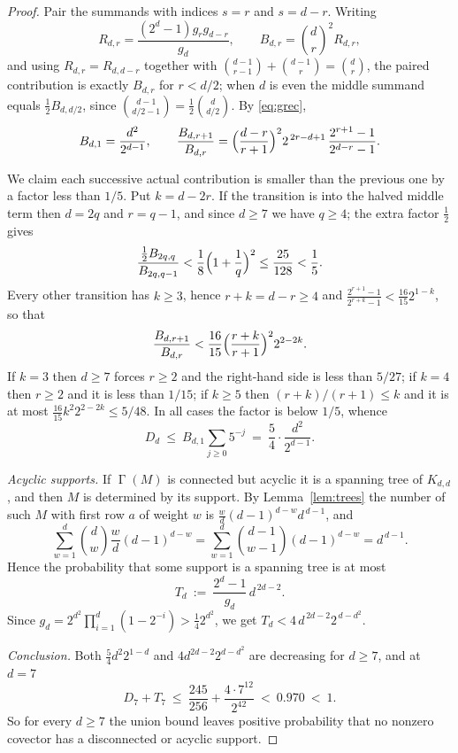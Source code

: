 \documentclass[10pt,a4paper]{amsart}
\DeclareMathOperator{\Gam}{\Gamma}
\begin{document}
\begin{proof}
Pair the summands with indices $s=r$ and $s=d-r$. Writing
\[
R_{d,r}=\frac{(2^{d}-1)g_{r}g_{d-r}}{g_{d}},\qquad B_{d,r}=\binom{d}{r}^{2}R_{d,r},
\]
and using $R_{d,r}=R_{d,d-r}$ together with $\binom{d-1}{r-1}+\binom{d-1}{r}=\binom{d}{r}$, the paired contribution is exactly $B_{d,r}$ for $r<d/2$; when $d$ is even the middle summand equals $\tfrac12 B_{d,d/2}$, since $\binom{d-1}{d/2-1}=\tfrac12\binom{d}{d/2}$. By \eqref{eq:grec},
\[
B_{d,1}=\frac{d^{2}}{2^{d-1}},\qquad
\frac{B_{d,r+1}}{B_{d,r}}=\Bigl(\frac{d-r}{r+1}\Bigr)^{2}2^{\,2r-d+1}\,\frac{2^{r+1}-1}{2^{d-r}-1}.
\]

We claim each successive actual contribution is smaller than the previous one by a factor less than $1/5$. Put $k=d-2r$. If the transition is into the halved middle term then $d=2q$ and $r=q-1$, and since $d\ge 7$ we have $q\ge 4$; the extra factor $\tfrac12$ gives
\[
\frac{\tfrac12 B_{2q,q}}{B_{2q,q-1}}<\frac{1}{8}\Bigl(1+\frac{1}{q}\Bigr)^{2}\le\frac{25}{128}<\frac{1}{5}.
\]
Every other transition has $k\ge 3$, hence $r+k=d-r\ge 4$ and $\frac{2^{r+1}-1}{2^{r+k}-1}<\frac{16}{15}2^{1-k}$, so that
\[
\frac{B_{d,r+1}}{B_{d,r}}<\frac{16}{15}\Bigl(\frac{r+k}{r+1}\Bigr)^{2}2^{2-2k}.
\]
If $k=3$ then $d\ge 7$ forces $r\ge 2$ and the right-hand side is less than $5/27$; if $k=4$ then $r\ge 2$ and it is less than $1/15$; if $k\ge 5$ then $(r+k)/(r+1)\le k$ and it is at most $\tfrac{16}{15}k^{2}2^{2-2k}\le 5/48$. In all cases the factor is below $1/5$, whence
\begin{equation}\label{eq:Ddbound}
D_{d}\ \le\ B_{d,1}\sum_{j\ge 0}5^{-j}\ =\ \frac{5}{4}\cdot\frac{d^{2}}{2^{d-1}}.
\end{equation}

\smallskip
\noindent\emph{Acyclic supports.} If $\Gam(M)$ is connected but acyclic it is a spanning tree of $K_{d,d}$, and then $M$ is determined by its support. By Lemma~\ref{lem:trees} the number of such $M$ with first row $a$ of weight $w$ is $\tfrac{w}{d}(d-1)^{d-w}d^{\,d-1}$, and
\[
\sum_{w=1}^{d}\binom{d}{w}\frac{w}{d}(d-1)^{d-w}=\sum_{w=1}^{d}\binom{d-1}{w-1}(d-1)^{d-w}=d^{\,d-1}.
\]
Hence the probability that some support is a spanning tree is at most
\begin{equation}\label{eq:Td}
T_{d}\ :=\ \frac{2^{d}-1}{g_{d}}\,d^{\,2d-2}.
\end{equation}
Since $g_{d}=2^{d^{2}}\prod_{i=1}^{d}(1-2^{-i})>\tfrac14 2^{d^{2}}$, we get $T_{d}<4\,d^{\,2d-2}2^{\,d-d^{2}}$.

\smallskip
\noindent\emph{Conclusion.} Both $\tfrac54 d^{2}2^{1-d}$ and $4d^{2d-2}2^{d-d^{2}}$ are decreasing for $d\ge 7$, and at $d=7$
\[
D_{7}+T_{7}\ \le\ \frac{245}{256}+\frac{4\cdot 7^{12}}{2^{42}}\ <\ 0.970\ <\ 1 .
\]
So for every $d\ge 7$ the union bound leaves positive probability that no nonzero covector has a disconnected or acyclic support.
\end{proof}
\end{document}

